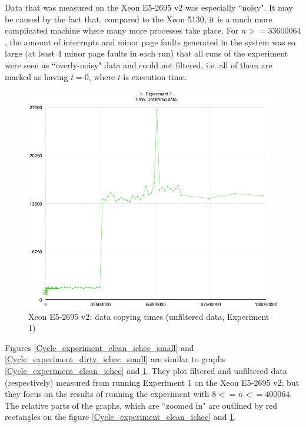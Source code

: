 Data that was measured on the Xeon E5-2695 v2 was especially ``noisy". It may be caused by the fact that, compared to the Xeon 5130, it is a much more complicated machine where many more processes take place. For $n >= 33600064$, the amount of interrupts and minor page faults generated in the system was so large (at least 4 minor page faults in each run) that all runs of the experiment were seen as ``overly-noisy" data and could not filtered, i.e. all of them are marked as having $t = 0$, where $t$ is execution time.

\begin{figure}[!htb]
\centering
\includegraphics[width=145mm]{6/Cycle_experiment_dirty_ichec.png}
\caption{Xeon E5-2695 v2: data copying times (unfiltered data, Experiment 1)}
\label{Cycle_experiment_dirty_ichec}
\end{figure}

Figures \ref{Cycle_experiment_clean_ichec_small} and \ref{Cycle_experiment_dirty_ichec_small} are similar to graphs \ref{Cycle_experiment_clean_ichec} and \ref{Cycle_experiment_dirty_ichec}. They plot filtered and unfiltered data (respectively) measured from running Experiment 1 on the Xeon E5-2695 v2, but they focus on the results of running the experiment with $8 <= n <= 400064$. The relative parts of the graphs, which are ``zoomed in" are outlined by red rectangles on the figure \ref{Cycle_experiment_clean_ichec} and \ref{Cycle_experiment_dirty_ichec}.

